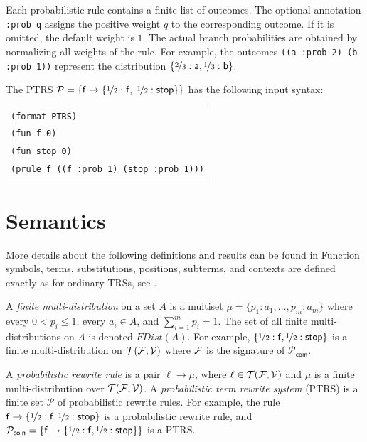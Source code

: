 Each probabilistic rule contains a finite list of outcomes.
The optional annotation \texttt{:prob q} assigns the positive weight $q$ to the corresponding outcome.
If it is omitted, the default weight is $1$.
The actual branch probabilities are obtained by normalizing all weights of the rule.
For example, the outcomes \texttt{((a :prob 2) (b :prob 1))} represent the distribution
$\{\nicefrac{2}{3}:\mathsf{a},\nicefrac{1}{3}:\mathsf{b}\}$.

\begin{example}
The PTRS $\mathcal{P} = \{\mathsf{f} \to \{\nicefrac{1}{2}:\mathsf{f},\; \nicefrac{1}{2}:\mathsf{stop}\}\}$
has the following input syntax:
\begin{center}
\begin{tabular}{l}
\texttt{(format PTRS)} \\
\texttt{(fun f 0)} \\
\texttt{(fun stop 0)} \\
\texttt{(prule f ((f :prob 1) (stop :prob 1)))}
\end{tabular}
\end{center}
\end{example}

\section{Semantics}

More details about the following definitions and results can be found in \cite{avanzini2018ProbabilisticTermRewriting}
Function symbols, terms, substitutions, positions, subterms, and contexts are defined exactly as for ordinary TRSs, see .

A \emph{finite multi-distribution} on a set $A$ is a multiset
$\mu = \{p_1:a_1,\ldots,p_m:a_m\}$ where every $0 < p_i \leq 1$,
every $a_i \in A$, and $\sum_{i=1}^m p_i = 1$.
The set of all finite multi-distributions on $A$ is denoted $\mathit{FDist}(A)$.
For example, $\{\nicefrac{1}{2}:\mathsf{f},\nicefrac{1}{2}:\mathsf{stop}\}$ is a finite multi-distribution on
$\mathcal{T}(\mathcal{F},\mathcal{V})$ where $\mathcal{F}$ is the signature of $\mathcal{P}_{\mathsf{coin}}$.

A \emph{probabilistic rewrite rule} is a pair $\ell \to \mu$, where $\ell \in \mathcal{T}(\mathcal{F},\mathcal{V})$ and
$\mu$ is a finite multi-distribution over $\mathcal{T}(\mathcal{F},\mathcal{V})$.
A \emph{probabilistic term rewrite system} (PTRS) is a finite set $\mathcal{P}$ of probabilistic rewrite rules.
For example, the rule $\mathsf{f} \to \{\nicefrac{1}{2}:\mathsf{f},\nicefrac{1}{2}:\mathsf{stop}\}$ is a probabilistic rewrite rule,
and $\mathcal{P}_{\mathsf{coin}} = \{\mathsf{f} \to \{\nicefrac{1}{2}:\mathsf{f},\nicefrac{1}{2}:\mathsf{stop}\}\}$ is a PTRS.

